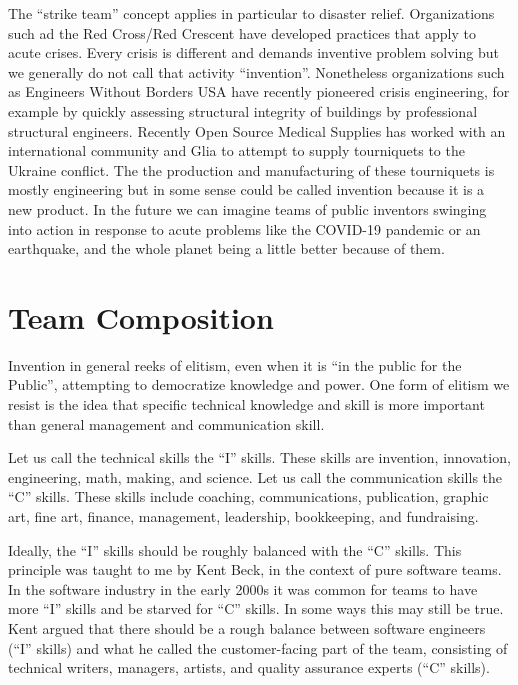 \documentclass[
	fontsize=10pt, %
	twoside=false, %
	secnumdepth=1, %
]{kaobook}
\begin{document}
The ``strike team'' concept applies in particular to disaster relief.
Organizations such ad the Red Cross/Red Crescent have developed
practices that apply to acute crises. Every crisis is different and demands
inventive problem solving
but we generally do not call that activity ``invention''.
Nonetheless organizations such as Engineers Without Borders USA\cite{enwiki:1084103555} have
recently pioneered crisis engineering, for example by quickly assessing
structural integrity of buildings by professional structural engineers.
Recently Open Source Medical Supplies\cite{osms} has worked with an international community
and Glia to attempt to supply tourniquets to the Ukraine conflict.
The the production and manufacturing of these tourniquets is mostly
engineering but in some sense could be called invention because it is a new
product. In the future we can imagine teams of public inventors swinging
into action in response to acute problems like the COVID-19 pandemic
or an earthquake, and the whole planet being a little better because
of them.

\chapter{Team Composition}

\label{chap:composition}

Invention in general reeks of elitism, even when it is ``in
the public for the Public'', attempting to democratize knowledge and power.
One form of elitism we resist is the idea that specific technical knowledge
and skill is more important than general management and communication skill.

Let us call the technical skills the ``I'' skills. These skills
are invention, innovation, engineering, math, making, and science.
Let us call the communication skills the ``C'' skills. These skills
include coaching, communications, publication, graphic art, fine art,
finance, management, leadership, bookkeeping, and fundraising.

Ideally, the ``I'' skills should be roughly balanced with the ``C'' skills.
This principle was taught to me by Kent Beck, in the context of pure
software teams. In the software industry in the early 2000s it was common
for teams to have more ``I'' skills and be starved for ``C'' skills.
In some ways this may still be true. Kent argued that there
should be a rough balance between software engineers (``I'' skills) and what he
called the customer-facing part of the team, consisting of technical writers,
managers, artists, and quality assurance experts (``C'' skills).
\end{document}
